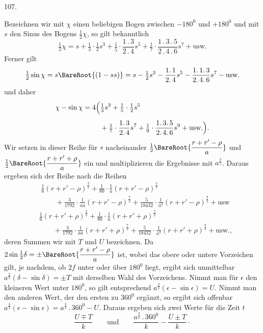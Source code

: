 \par{}\medskip
{}
\begin{center}107.\end{center}
Bezeichnen wir mit $\chi$ einen beliebigen Bogen zwischen $-180^0$ und $+180^0$ und mit $s$ den Sinus des Bogens $\tfrac12\chi$, so gilt bekanntlich
\[
\tfrac12\chi=s+\tfrac13\cdot\tfrac12s^3+\tfrac15\cdot\frac{1\mathpunct{.}3}{2\mathpunct{.}4}s^5+\tfrac17\cdot\frac{1\mathpunct{.}3\mathpunct{.}5}{2\mathpunct{.}4\mathpunct{.}6}s^7+\text{usw.}
\]
\noindent Ferner gilt
\[
\tfrac12\sin\chi=s\BareRoot{(1-ss)}=s-\tfrac12s^3-\frac{1\mathpunct{.}1}{2\mathpunct{.}4}s^5-\frac{1\mathpunct{.}1\mathpunct{.}3}{2\mathpunct{.}4\mathpunct{.}6}s^7-\text{usw.}
\]
\noindent und daher
\[
\begin{aligned}
\chi-\sin\chi=4\Bigl(&\tfrac13s^3+\tfrac15\cdot\tfrac12s^5\\[.5em]
&+\tfrac17\cdot\frac{1\mathpunct{.}3}{2\mathpunct{.}4}s^7+\tfrac19\cdot\frac{1\mathpunct{.}3\mathpunct{.}5}{2\mathpunct{.}4\mathpunct{.}6}s^9+\text{usw.}\Bigr).
\end{aligned}
\]
\noindent Wir setzen in dieser Reihe für $s$ nacheinander $\tfrac12\BareRoot{\dfrac{r+r'-\rho}{a}}$ und $\tfrac12\BareRoot{\dfrac{r+r'+\rho}{a}}$ ein und multiplizieren die Ergebnisse mit $a^{\frac32}$. Daraus ergeben sich der Reihe nach die Reihen
\[
\begin{aligned}
&\tfrac16(r+r'-\rho)^{\frac32}+\tfrac1{80}\cdot\frac1a(r+r'-\rho)^{\frac52}\\[.5em]
&\qquad+\tfrac3{1792}\cdot\frac1{aa}(r+r'-\rho)^{\frac72}+\tfrac5{18432}\cdot\frac1{a^3}(r+r'-\rho)^{\frac92}+\text{usw}
\end{aligned}
\]
\[
\begin{aligned}
&\tfrac16(r+r'+\rho)^{\frac32}+\tfrac1{80}\cdot\frac1a(r+r'+\rho)^{\frac52}\\[.5em]
&\qquad+\tfrac3{1792}\cdot\frac1{aa}(r+r'+\rho)^{\frac72}+\tfrac5{18432}\cdot\frac1{a^3}(r+r'+\rho)^{\frac92}+\text{usw.,}
\end{aligned}
\]
\noindent deren Summen wir mit $T$ und $U$ bezeichnen. Da $2\sin\tfrac12\delta=\pm\BareRoot{\dfrac{r+r'-\rho}{a}}$ ist, wobei das obere oder untere Vorzeichen gilt, je nachdem, ob $2f$ unter oder über $180^0$ liegt, ergibt sich unmittelbar $a^{\frac32}(\delta-\sin\delta)=\pm T$ mit derselben Wahl des Vorzeichens. Nimmt man für $\epsilon$ den kleineren Wert unter $180^0$, so gilt entsprechend $a^{\frac32}(\epsilon-\sin\epsilon)=U$. Nimmt man den anderen Wert, der den ersten zu $360^0$ ergänzt, so ergibt sich offenbar $a^{\frac32}(\epsilon-\sin\epsilon)=a^{\frac32}\mathpunct{.}360^0-U$. Daraus ergeben sich zwei Werte für die Zeit $t$
\[
\frac{U\mp T}{k}\qquad\text{und}\qquad\frac{a^{\frac32}\mathpunct{.}360^0}{k}-\frac{U\pm T}{k}\mathpunct{\cdot}
\]
